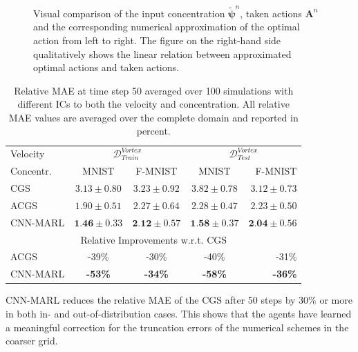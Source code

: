 \documentclass{article}
\theoremstyle{plain}
\theoremstyle{definition}
\theoremstyle{remark}
\begin{document}
\begin{figure}
\centering
    \caption{Visual comparison of the input concentration $\tilde{\boldsymbol \psi}^n$, taken actions $\boldsymbol A^n$ and the corresponding numerical approximation of the optimal action from left to right. The figure on the right-hand side qualitatively shows the linear relation between approximated optimal actions and taken actions.}
    \label{fig:action_interpretation}
\end{figure}

\begin{table}[!ht]
\caption{Relative MAE at time step 50 averaged over 100 simulations with different ICs to both the velocity and concentration. All relative MAE values are averaged over the complete domain and reported in percent.}
\label{tab:50_step_mae_advection}
\vskip 0.15in
\centering
\scriptsize 
\begin{tabular}{@{}l|cccr@{}}
\toprule
Velocity & \multicolumn{2}{c}{$\mathcal D^{Vortex}_{Train}$} & \multicolumn{2}{c}{$\mathcal D^{Vortex}_{Test}$} \\
Concentr. & MNIST & F-MNIST & MNIST & F-MNIST \\
\hline 
CGS & $3.13 \pm 0.80$ & $3.23 \pm 0.92$ & $3.82 \pm 0.78$ & $3.12 \pm 0.73$ \\ 
ACGS & $1.90 \pm 0.51$ & $2.27 \pm 0.64$ & $2.28 \pm 0.47$ & $2.23 \pm 0.50$\\
CNN-MARL & $\textbf{1.46} \pm 0.33$ & $\textbf{2.12} \pm 0.57$  & $\textbf{1.58} \pm 0.37$ & $\textbf{2.04} \pm 0.56$ \\  \bottomrule
\multicolumn{5}{c}{Relative Improvements w.r.t. CGS} \\
 \bottomrule
ACGS &  -39\% &  -30\% &  -40\% &  -31\%\\
 CNN-MARL & \textbf{-53\%} & \textbf{-34\%} & \textbf{-58\%} & \textbf{-36\%} \\ 
 \bottomrule
\end{tabular}
\end{table}
CNN-MARL reduces the relative MAE of the CGS after 50 steps by $30\%$ or more in both in- and out-of-distribution cases. This shows that the agents have learned a meaningful correction for the truncation errors of the numerical schemes in the coarser grid. 
\end{document}
